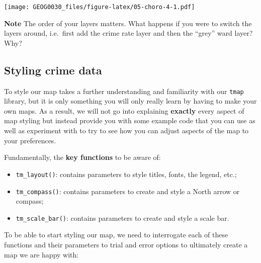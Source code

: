 \documentclass[
]{book}
\providecommand{\tightlist}{%
  \setlength{\itemsep}{0pt}\setlength{\parskip}{0pt}}
\begin{document}
\texttt{[image: GEOG0030\_files/figure-latex/05-choro-4-1.pdf]}

\textbf{Note}
The order of your layers matters. What happens if you were to switch the layers around, i.e.~first add the crime rate layer and then the ``grey'' ward layer? Why?

\hypertarget{styling-crime-data}{%
\subsection{Styling crime data}\label{styling-crime-data}}

To style our map takes a further understanding and familiarity with our \texttt{tmap} library, but it is only something you will only really learn by having to make your own maps. As a result, we will not go into explaining \textbf{exactly} every aspect of map styling but instead provide you with some example code that you can use as well as experiment with to try to see how you can adjust aspects of the map to your preferences.

Fundamentally, the \textbf{key functions} to be aware of:

\begin{itemize}
\tightlist
\item
  \texttt{tm\_layout()}: contains parameters to style titles, fonts, the legend, etc.;
\item
  \texttt{tm\_compass()}: contains parameters to create and style a North arrow or compass;
\item
  \texttt{tm\_scale\_bar()}: contains parameters to create and style a scale bar.
\end{itemize}

To be able to start styling our map, we need to interrogate each of these functions and their parameters to trial and error options to ultimately create a map we are happy with:
\end{document}
